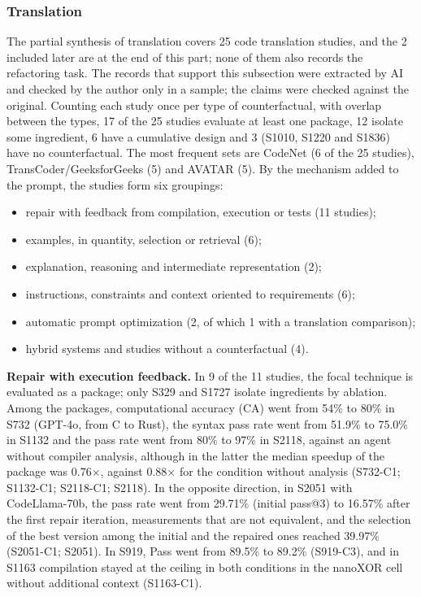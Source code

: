 \subsubsection{Translation}

The partial synthesis of translation covers 25 code translation studies, and the 2 included later are at the end of this
part; none of them also records the refactoring task. The records that support this subsection were extracted by AI and checked by the author only in a sample; the claims were checked against the original. Counting each study once per type of counterfactual, with overlap between the types, 17 of the 25 studies evaluate at least one package, 12 isolate some ingredient, 6 have a cumulative design and 3 (S1010, S1220 and S1836) have no counterfactual. The most frequent sets are CodeNet (6 of the 25 studies), TransCoder/GeeksforGeeks (5) and AVATAR (5). By the mechanism added to the prompt, the studies form six groupings:
\begin{itemize}
  \item repair with feedback from compilation, execution or tests (11 studies);
  \item examples, in quantity, selection or retrieval (6);
  \item explanation, reasoning and intermediate representation (2);
  \item instructions, constraints and context oriented to requirements (6);
  \item automatic prompt optimization (2, of which 1 with a translation comparison);
  \item hybrid systems and studies without a counterfactual (4).
\end{itemize}

\textbf{Repair with execution feedback.} In 9 of the 11 studies, the focal technique is evaluated as a package; only S329 and S1727 isolate ingredients by ablation.
Among the packages, computational accuracy (CA) went from 54\% to 80\% in S732 (GPT-4o, from C to Rust), the syntax pass rate went from 51.9\% to 75.0\% in S1132 and the pass rate went from 80\% to 97\% in S2118, against an agent without compiler analysis, although in the latter the median speedup of the package was 0.76$\times$, against 0.88$\times$ for the condition without analysis (S732-C1; S1132-C1; S2118-C1; S2118).
In the opposite direction, in S2051 with CodeLlama-70b, the pass rate went from 29.71\% (initial pass@3) to 16.57\% after the first repair iteration, measurements that are not equivalent, and the selection of the best version among the initial and the repaired ones reached 39.97\% (S2051-C1; S2051). In S919, Pass went from 89.5\% to 89.2\% (S919-C3), and in S1163 compilation stayed at the ceiling in both conditions in the nanoXOR cell without additional context (S1163-C1).


